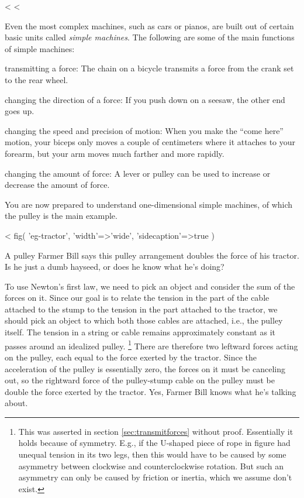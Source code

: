 <%
<%

Even the most complex machines, such as cars or pianos, are
built out of certain basic units called 
\emph{simple machines}. The following are some of
the main functions of simple machines:

\begin{indentedblock}
\noindent transmitting a force: The chain on a bicycle transmits a
force from the crank set to the rear wheel.

\noindent changing the direction of a force: If you push down on a
seesaw, the other end goes up.

\noindent changing the speed and precision of motion: When you make
the ``come here'' motion, your biceps only moves a couple of
centimeters where it attaches to your forearm, but your arm
moves much farther and more rapidly.

\noindent changing the amount of force: A lever or pulley can be used
to increase or decrease the amount of force.
\end{indentedblock}

\noindent You are now prepared to understand one-dimensional simple
machines, of which the pulley is the main example.

<%
  fig(
    'eg-tractor',
    {
      'width'=>'wide',
      'sidecaption'=>true
    }
  )

\begin{eg}{A pulley}\label{eg:tractor}
\egquestion Farmer Bill says this pulley arrangement doubles
the force of his tractor. Is he just a dumb hayseed, or does
he know what he's doing?

\eganswer To use Newton's first law, we need to pick an
object and consider the sum of the forces on it. Since our
goal is to relate the tension in the part of the cable
attached to the stump to the tension in the part attached to
the tractor, we should pick an object to which both those
cables are attached, i.e., the pulley itself. The tension in a string or cable remains
approximately constant as it passes around an idealized pulley.
\footnote{This was asserted in section \ref{sec:transmitforces} without proof.
      Essentially it holds because of symmetry. E.g., if the U-shaped piece of rope in figure 
      had unequal tension in its two legs, then this would have to be caused by some asymmetry between clockwise and counterclockwise
      rotation. But such an asymmetry can only be caused by friction or inertia, which we assume don't exist.}
 There are
therefore two leftward forces acting on the pulley, each
equal to the force exerted by the tractor. Since the
acceleration of the pulley is essentially zero, the forces
on it must be canceling out, so the rightward force of the
pulley-stump cable on the pulley must be double the force
exerted by the tractor. Yes, Farmer Bill knows what he's talking about.
\end{eg}

